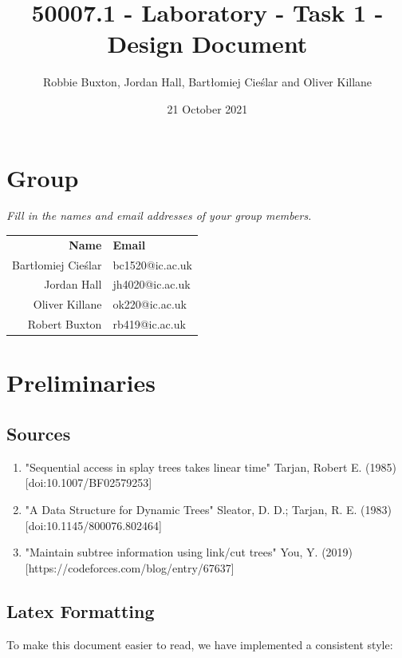 \documentclass{report}
\title{50007.1 - Laboratory - Task 1 - Design Document}
\author{Robbie Buxton, Jordan Hall, Bartłomiej Cieślar and Oliver Killane}
\date{21 October 2021}
\newcommand{\question}[1]{\textit{#1} \\ }
\begin{document}
    \maketitle
    \section*{Group}
        \question{Fill in the names and email addresses of your group members.}
        \begin{center}
            \begin{tabular}{r l}
                \textbf{Name} & \textbf{Email} \\
                Bartłomiej Cieślar & bc1520@ic.ac.uk \\
                Jordan Hall & jh4020@ic.ac.uk \\
                Oliver Killane & ok220@ic.ac.uk \\
                Robert Buxton & rb419@ic.ac.uk \\
            \end{tabular}
        \end{center}

    \section*{Preliminaries}
        \subsection*{Sources}
        \begin{enumerate}
            \item "Sequential access in splay trees takes linear time" Tarjan, Robert E. (1985) [doi:10.1007/BF02579253]
            \item "A Data Structure for Dynamic Trees" Sleator, D. D.; Tarjan, R. E. (1983) [doi:10.1145/800076.802464]
            \item "Maintain subtree information using link/cut trees" You, Y. (2019) [https://codeforces.com/blog/entry/67637]
        \end{enumerate}
        \subsection*{Latex Formatting}
            To make this document easier to read, we have implemented a consistent style:
\end{document}
